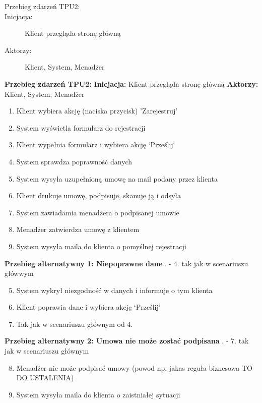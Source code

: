 \documentclass[10pt,a4paper,titlepage]{article} %
\begin{document}
		\begin{description}
			\item[Przebieg zdarzeń TPU2:]
			\item[Inicjacja:] Klient przegląda stronę główną 
			\item[Aktorzy:]  Klient, System, Menadżer
		\end{description}
		
		{\bf Przebieg zdarzeń TPU2:}\newline
		{\bf Inicjacja:} Klient przegląda stronę główną \newline
		{\bf Aktorzy:} Klient, System, Menadżer 
			\begin{enumerate}
			  \item Klient wybiera akcję (naciska przycisk) 'Zarejestruj'
			  \item System wyświetla formularz do rejestracji
			  \item Klient wypełnia formularz i wybiera akcję `Prześlij`
			  \item System sprawdza poprawność danych
			  \item System wysyła uzupełnioną umowę na mail podany przez klienta
			  \item Klient drukuje umowę, podpisuje, skanuje ją i odsyła
			  \item System zawiadamia menadżera o podpisanej umowie
			  \item Menadżer zatwierdza umowę z klientem
			  \item System wysyła maila do klienta o pomyślnej rejestracji
			\end{enumerate}
			
			
		
		{\bf Przebieg alternatywny 1: Niepoprawne dane} . - 4. tak jak w scenariuszu główwym
			\begin{enumerate}
			  \setcounter{enumi}{4}
			  \item System wykrył niezgodność w danych i informuje o tym klienta
			  \item Klient poprawia dane i wybiera akcję `Prześlij'
			  \item Tak jak w scenariuszu głównym od 4.
			\end{enumerate}
			
	   {\bf Przebieg alternatywny 2: Umowa nie może zostać podpisana} . - 7. tak jak w scenariuszu głównym
			\begin{enumerate}
			  \setcounter{enumi}{7}
			  \item Menadżer nie może podpisać umowy (powod np. jakas reguła biznesowa
			  TO DO USTALENIA)
			  \item System wysyła maila do klienta o zaistniałej sytuacji
			\end{enumerate}
			
\end{document}

